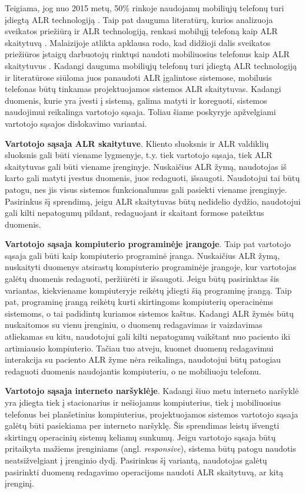Teigiama, jog nuo 2015 metų, 50\% rinkoje naudojamų mobiliųjų telefonų turi įdiegtą ALR technologiją \cite{forum2}. Taip pat dauguma literatūrų, kurios analizuoja sveikatos priežiūrą ir ALR technologiją, renkasi mobilųjį telefoną kaip ALR skaitytuvą \cite{Azlina2013} \cite{Strommer2006} \cite{Puma2012} \cite{Marcus} \cite{Gautam}. Malaizijoje atlikta apklausa rodo, kad didžioji dalis sveikatos priežiūros įstaigų darbuotojų rinktųsi naudoti mobiliuosius telefonus kaip ALR skaitytuvus \cite{Azlina2013}. Kadangi dauguma mobiliųjų telefonų turi įdiegtą ALR technologiją ir literatūrose siūloma juos panaudoti ALR įgalintose sistemose, mobilusis telefonas būtų tinkamas projektuojamos sistemos ALR skaitytuvas. Kadangi duomenis, kurie yra įvesti į sistemą, galima matyti ir koreguoti, sistemos naudojimui reikalinga vartotojo sąsaja. Toliau šiame poskyryje apžvelgiami vartotojo sąsajos dislokavimo variantai.

\textbf{Vartotojo sąsaja ALR skaitytuve}. Kliento sluoksnis ir ALR valdiklių sluoksnis gali būti viename lygmenyje, t.y. tiek vartotojo sąsaja, tiek ALR skaitytuvas gali būti viename įrenginyje. Nuskaičius ALR žymą, naudotojas iš karto gali matyti įvestus duomenis, juos redaguoti, išsaugoti. Naudotojui tai būtų patogu, nes jis visus sistemos funkcionalumus gali pasiekti viename įrenginyje. Pasirinkus šį sprendimą, jeigu ALR skaitytuvas būtų nedidelio dydžio, naudotojui gali kilti nepatogumų pildant, redaguojant ir skaitant formose pateiktus duomenis.

\textbf{Vartotojo sąsaja kompiuterio programinėje įrangoje}. Taip pat vartotojo sąsaja gali būti kaip kompiuterio programinė įranga. Nuskaičius ALR žymą, nuskaityti duomenys atsirastų kompiuterio programinėje įrangoje, kur vartotojas galėtų duomenis redaguoti, peržiūrėti ir išsaugoti. Jeigu būtų pasirinktas šis variantas, kiekviename kompiuteryje reikėtų įdiegti šią programinę įrangą. Taip pat, programinę įrangą reikėtų kurti skirtingoms kompiuterių operacinėms sistemoms, o tai padidintų kuriamos sistemos kaštus. Kadangi ALR žymės būtų nuskaitomos su vienu įrenginiu, o duomenų redagavimas ir vaizdavimas atliekamas su kitu, naudotojui gali kilti nepatogumų vaikštant nuo paciento iki artimiausio kompiuterio. Tačiau tuo atveju, kuomet duomenų redagavimui interakcija su paciento ALR žyme nėra reikalinga, naudotojui būtų patogiau redaguoti duomenis naudojantis kompiuteriu, o ne mobiliuoju telefonu. 

\textbf{Vartotojo sąsaja interneto naršyklėje}. Kadangi šiuo metu interneto naršyklė yra įdiegta tiek į stacionarius ir nešiojamus kompiuterius, tiek į mobiliuosius telefonus bei planšetinius kompiuterius, projektuojamos sistemos vartotojo sąsaja galėtų būti pasiekiama per interneto naršyklę. Šis sprendimas leistų išvengti skirtingų operacinių sistemų keliamų sunkumų. Jeigu vartotojo sąsaja būtų pritaikyta mažiems įrenginiams (angl. \textit{responsive}), sistema būtų patogu naudotis neatsižvelgiant į įrenginio dydį. Pasirinkus šį variantą, naudotojas galėtų pasirinkti duomenų redagavimo operacijoms naudoti ALR skaitytuvą, ar kitą įrenginį. 


